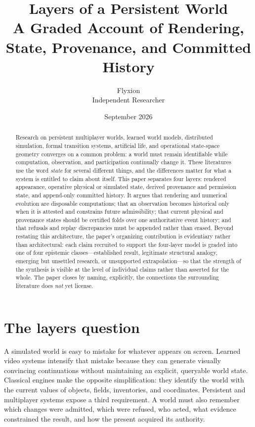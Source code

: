 \documentclass[11pt]{article}
\title{\textbf{Layers of a Persistent World}\\[0.3em]
\large A Graded Account of Rendering, State, Provenance, and Committed History}
\author{Flyxion\\Independent Researcher}
\date{September 2026}
\begin{document}
\maketitle

\begin{abstract}
\noindent Research on persistent multiplayer worlds, learned world models, distributed simulation, formal transition systems, artificial life, and operational state-space geometry converges on a common problem: a world must remain identifiable while computation, observation, and participation continually change it. These literatures use the word \emph{state} for several different things, and the differences matter for what a system is entitled to claim about itself. This paper separates four layers: rendered appearance, operative physical or simulated state, derived provenance and permission state, and append-only committed history. It argues that rendering and numerical evolution are disposable computations; that an observation becomes historical only when it is attested and constrains future admissibility; that current physical and provenance states should be certified folds over one authoritative event history; and that refusals and replay discrepancies must be appended rather than erased. Beyond restating this architecture, the paper's organizing contribution is evidentiary rather than architectural: each claim recruited to support the four-layer model is graded into one of four epistemic classes---established result, legitimate structural analogy, emerging but unsettled research, or unsupported extrapolation---so that the strength of the synthesis is visible at the level of individual claims rather than asserted for the whole. The paper closes by naming, explicitly, the connections the surrounding literature does \emph{not} yet license.
\end{abstract}

\tableofcontents

\section{The layers question}
\label{sec:layers-question}

A simulated world is easy to mistake for whatever appears on screen. Learned video systems intensify that mistake because they can generate visually convincing continuations without maintaining an explicit, queryable world state. Classical engines make the opposite simplification: they identify the world with the current values of objects, fields, inventories, and coordinates. Persistent and multiplayer systems expose a third requirement. A world must also remember which changes were admitted, which were refused, who acted, what evidence constrained the result, and how the present acquired its authority.
\end{document}
